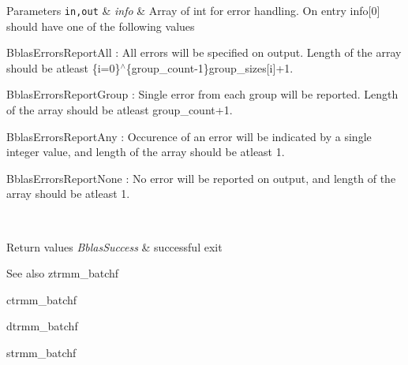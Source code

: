 \begin{DoxyParams}[1]{Parameters}
\hline
\mbox{\tt in,out}  & {\em info} & Array of int for error handling. On entry info\mbox{[}0\mbox{]} should have one of the following values
\begin{DoxyItemize}
\item Bblas\+Errors\+Report\+All \+: All errors will be specified on output. Length of the array should be atleast \{i=0\}$^\wedge$\{group\+\_\+count-\/1\}group\+\_\+sizes\mbox{[}i\mbox{]}+1.
\item Bblas\+Errors\+Report\+Group \+: Single error from each group will be reported. Length of the array should be atleast group\+\_\+count+1.
\item Bblas\+Errors\+Report\+Any \+: Occurence of an error will be indicated by a single integer value, and length of the array should be atleast 1.
\item Bblas\+Errors\+Report\+None \+: No error will be reported on output, and length of the array should be atleast 1.
\end{DoxyItemize}\\
\hline
\end{DoxyParams}

\begin{DoxyRetVals}{Return values}
{\em Bblas\+Success} & successful exit\\
\hline
\end{DoxyRetVals}
\begin{DoxySeeAlso}{See also}
ztrmm\+\_\+batchf 

ctrmm\+\_\+batchf 

dtrmm\+\_\+batchf 

strmm\+\_\+batchf 
\end{DoxySeeAlso}
